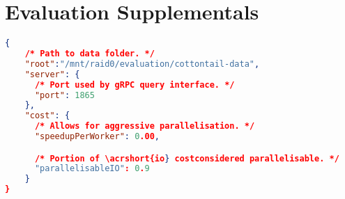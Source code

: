 \chapter{Evaluation Supplementals}
\label{chapter:appendix_supplementals}


\begin{lstlisting}[language=json, caption={Cottontail DB configuration used during the entire evaluation (config.json).}, label=listing:cottontail_config, numbers=none]
{
    /* Path to data folder. */
    "root":"/mnt/raid0/evaluation/cottontail-data",
    "server": {
      /* Port used by gRPC query interface. */
      "port": 1865
    },
    "cost": {
      /* Allows for aggressive parallelisation. */
      "speedupPerWorker": 0.00,  

      /* Portion of \acrshort{io} costconsidered parallelisable. */
      "parallelisableIO": 0.9
    }
} 
\end{lstlisting}

\clearpage

